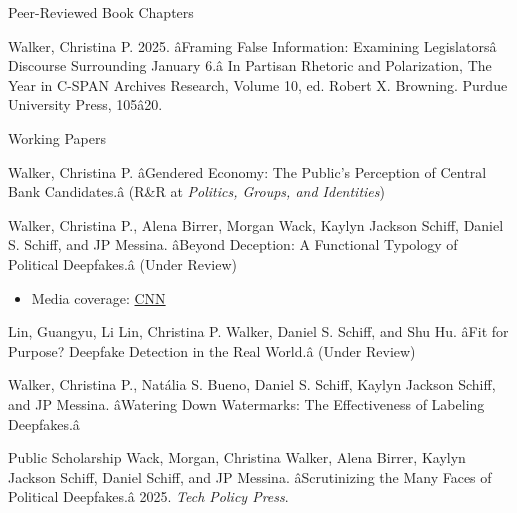 \documentclass{resume} %
\begin{document}
\begin{rSection}{Peer-Reviewed Book Chapters}
\begin{etaremune}
\item Walker, Christina P. 2025. âFraming False Information: Examining Legislatorsâ Discourse Surrounding January 6.â In Partisan Rhetoric and Polarization, The Year in C-SPAN Archives Research, Volume 10, ed. Robert X. Browning. Purdue University Press, 105â20.\href{https://doi-org.ezproxy.lib.purdue.edu/10.2307/jj.22177843.11}{}
\end{etaremune}
\end{rSection}



\begin{rSection}{Working Papers}

Walker, Christina P. âGendered Economy: The Public's Perception of Central Bank Candidates.â (R\&R at \textit{Politics, Groups, and Identities})

Walker, Christina P., Alena Birrer, Morgan Wack, Kaylyn Jackson Schiff, Daniel S. Schiff, and JP Messina. âBeyond Deception: A Functional Typology of Political Deepfakes.â (Under Review)\href{https://papers.ssrn.com/sol3/papers.cfm?abstract_id=5717943}{}
\begin{itemize}
    \item Media coverage: \href{https://www.cnn.com/2026/04/16/politics/pope-trump-jesus-meme-ai-deepfakes-analysis}{CNN}
\end{itemize}

Lin, Guangyu, Li Lin, Christina P. Walker, Daniel S. Schiff, and Shu Hu. âFit for Purpose? Deepfake Detection in the Real World.â (Under Review)\href{https://doi.org/10.48550/arXiv.2510.16556}{}

Walker, Christina P., Nat\'{a}lia S. Bueno, Daniel S. Schiff, Kaylyn Jackson Schiff, and JP Messina. âWatering Down Watermarks: The Effectiveness of Labeling Deepfakes.â\href{https://doi.org/10.17605/OSF.IO/4UWJG}{}


\end{rSection}

\begin{rSection}{Public Scholarship}
Wack, Morgan, Christina Walker, Alena Birrer, Kaylyn Jackson Schiff, Daniel Schiff, and JP Messina. âScrutinizing the Many Faces of Political Deepfakes.â 2025. \textit{Tech Policy Press}.\href{https://www.techpolicy.press/scrutinizing-the-many-faces-of-political-deepfakes/}{}

\end{rSection}
\end{document}
